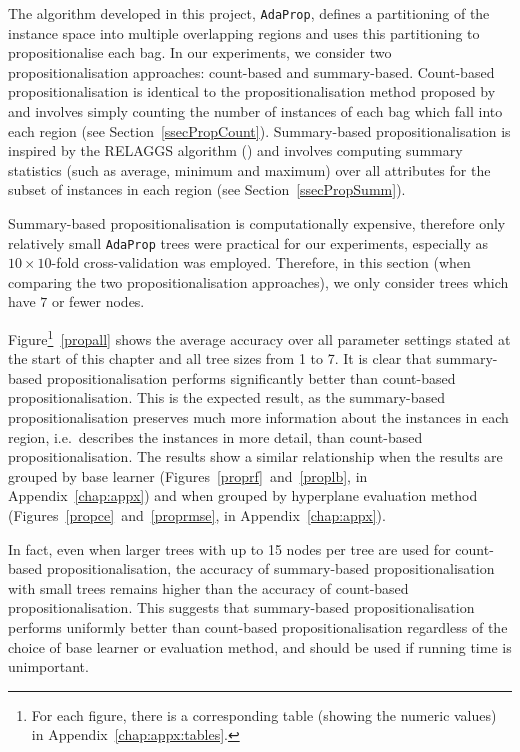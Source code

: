 \documentclass[a4paper,12pt]{report} %
\newcommand{\AdaProp}{\texttt{AdaProp}\xspace}
\begin{document}
The algorithm developed in this project, \AdaProp, defines a partitioning of the instance space into multiple overlapping regions
	and uses this partitioning to propositionalise each bag.
In our experiments, we consider two propositionalisation approaches:
	count-based and summary-based.
Count-based propositionalisation is identical to the propositionalisation method
	proposed by  and involves simply counting the number of 
	instances of each bag which fall into each region (see Section~\ref{ssecPropCount}).
Summary-based propositionalisation is inspired by the RELAGGS algorithm () 
	and involves computing summary statistics (such as average, minimum and maximum) 
	over all attributes for the subset of instances in each region (see Section~\ref{ssecPropSumm}).

Summary-based propositionalisation is computationally expensive, 
	therefore only relatively small \AdaProp trees were practical for our experiments,
	especially as $10\times 10$-fold cross-validation was employed.
Therefore, in this section (when comparing the two propositionalisation approaches), 
	we only consider trees which have $7$ or fewer nodes.
	
Figure\footnote{
	For each figure, there is a corresponding table (showing the numeric values) in Appendix~\ref{chap:appx:tables}.
	}~\ref{propall}	shows the average accuracy over all parameter settings stated 
	at the start of this chapter and all tree sizes from 1 to 7.
It is clear that summary-based propositionalisation performs significantly better than 
	count-based propositionalisation.
This is the expected result, as the summary-based propositionalisation preserves 
	much more information about the instances in each region, 
	i.e.\ describes the instances in more detail,
	than count-based propositionalisation.
The results show a similar relationship when the results are grouped by base learner
	(Figures~\ref{proprf}~and~\ref{proplb}, in Appendix~\ref{chap:appx})
	and when grouped by hyperplane evaluation method 
	(Figures~\ref{propce}~and~\ref{proprmse}, in Appendix~\ref{chap:appx}).

In fact, even when larger trees with up to 15 nodes per tree are used for count-based propositionalisation, 
	the accuracy of summary-based propositionalisation with small trees remains higher
	than the accuracy of count-based propositionalisation.
This suggests that summary-based propositionalisation performs uniformly better than
	count-based propositionalisation regardless of the choice of base learner or evaluation method, 
	and should be used if running time is unimportant.
\end{document}
